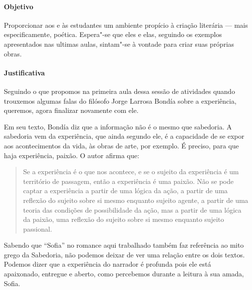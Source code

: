 \documentclass[12pt]{extarticle}
\begin{document}
\paragraph{Objetivo} Proporcionar aos e às estudantes um ambiente 
propício à criação literária --- mais especificamente, poética. Espera"-se
que eles e elas, seguindo os exemplos apresentados nas ultimas aulas,
sintam"-se à vontade para criar suas próprias obras.



\paragraph{Justificativa} Seguindo o que propomos na primeira aula dessa
sessão de atividades quando trouxemos algumas falas do filósofo Jorge 
Larrosa Bondía sobre a experiência, queremos, agora finalizar novamente
com ele.

Em seu texto, Bondía diz que a informação não é o mesmo que sabedoria.
A sabedoria vem da experiência, que ainda segundo ele, é a capacidade
de se expor  aos acontecimentos da vida, às obras de arte, por exemplo.
É preciso, para que haja experiência, paixão. O autor afirma que:

\begin{quote}

Se a experiência é 
o que nos acontece, e se o sujeito da experiência é um território de passagem,
então a experiência é uma paixão. Não se pode captar
a experiência a partir de uma lógica da ação, a partir
de uma reflexão do sujeito sobre si mesmo enquanto
sujeito agente, a partir de uma teoria das condições de
possibilidade da ação, mas a partir de uma lógica da
paixão, uma reflexão do sujeito sobre si mesmo enquanto sujeito passional.

\end{quote}

Sabendo que ``Sofia'' no romance aqui trabalhado também faz referência 
ao mito grego da Sabedoria, não podemos deixar de ver uma relação
entre os dois textos. Podemos dizer que a experiência do narrador
é profunda pois ele está apaixonado, entregue e aberto, como percebemos
durante a leitura à sua amada, Sofia. 
\end{document}
